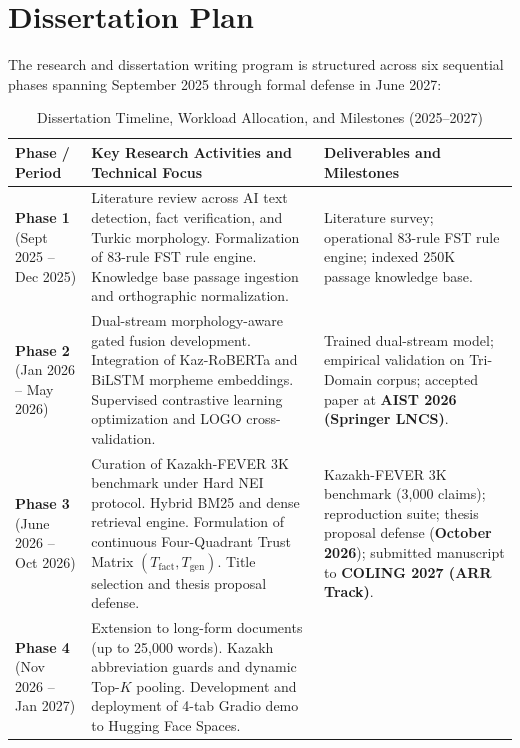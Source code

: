 \clearpage
\section{Dissertation Plan}
\label{sec:dissertation_plan}

The research and dissertation writing program is structured across six sequential phases spanning September 2025 through formal defense in June 2027:

\begin{table}[!htbp]
\centering
\footnotesize
\renewcommand{\arraystretch}{0.95}
\caption{Dissertation Timeline, Workload Allocation, and Milestones (2025--2027)}
\label{tab:dissertation_plan}
\begin{tabularx}{\textwidth}{|p{}|X|p{}|}
\hline
\textbf{Phase / Period} & \textbf{Key Research Activities and Technical Focus} & \textbf{Deliverables and Milestones} \\
\hline
\textbf{Phase 1} \newline (Sept 2025 -- Dec 2025) & 
Literature review across AI text detection, fact verification, and Turkic morphology. Formalization of 83-rule FST rule engine. Knowledge base passage ingestion and orthographic normalization. & 
Literature survey; operational 83-rule FST rule engine; indexed 250K passage knowledge base. \\
\hline
\textbf{Phase 2} \newline (Jan 2026 -- May 2026) & 
Dual-stream morphology-aware gated fusion development. Integration of Kaz-RoBERTa and BiLSTM morpheme embeddings. Supervised contrastive learning optimization and LOGO cross-validation. & 
Trained dual-stream model; empirical validation on Tri-Domain corpus; accepted paper at \textbf{AIST 2026 (Springer LNCS)}. \\
\hline
\textbf{Phase 3} \newline (June 2026 -- Oct 2026) & 
Curation of Kazakh-FEVER 3K benchmark under Hard NEI protocol. Hybrid BM25 and dense retrieval engine. Formulation of continuous Four-Quadrant Trust Matrix $(T_{\text{fact}}, T_{\text{gen}})$. Title selection and thesis proposal defense. & 
Kazakh-FEVER 3K benchmark (3,000 claims); reproduction suite; thesis proposal defense (\textbf{October 2026}); submitted manuscript to \textbf{COLING 2027 (ARR Track)}. \\
\hline
\textbf{Phase 4} \newline (Nov 2026 -- Jan 2027) & 
Extension to long-form documents (up to 25,000 words). Kazakh abbreviation guards and dynamic Top-$K$ pooling. Development and deployment of 4-tab Gradio demo to Hugging Face Spaces. & 

\end{tabularx}
\end{table}
